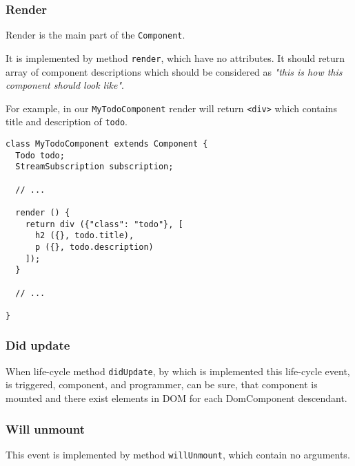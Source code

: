 \documentclass[oneside, 12pt]{book}
\begin{document}


    \subsubsection{Render}\label{subsec:our-architecture-lifecycle-render}

      Render is the main part of the \texttt{Component}. 

      It is implemented by method \texttt{render}, which have no attributes.
      It should return array of component descriptions which should be considered as 
      \textit{"this is how this component should look like"}.

      For example, in our \texttt{MyTodoComponent} render will return \texttt{<div>} which contains title and description of \texttt{todo}.
      \begin{verbatim}
class MyTodoComponent extends Component {
  Todo todo;
  StreamSubscription subscription;

  // ...

  render () {
    return div ({"class": "todo"}, [
      h2 ({}, todo.title),
      p ({}, todo.description)
    ]);
  }

  // ...

}
      \end{verbatim}




    \subsubsection{Did update}\label{subsec:our-architecture-lifecycle-didupdate}

      When life-cycle method \texttt{didUpdate}, 
      by which is implemented this life-cycle event, 
      is triggered, component, and programmer, can be sure, 
      that component is mounted and there exist elements in DOM for each DomComponent descendant.

    \subsubsection{Will unmount}\label{subsec:our-architecture-lifecycle-willunmount}

      This event is implemented by method \texttt{willUnmount}, which contain no arguments.
      
\end{document}
